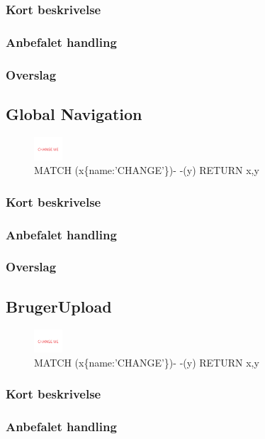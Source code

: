 \documentclass{article}
\begin{document}
\subsubsection{Kort beskrivelse}
\subsubsection{Anbefalet handling}
\subsubsection{Overslag}


\subsection{Global Navigation}
\begin{figure}[h]
\includegraphics[width=30pt]{CHANGE.PNG}
\caption{MATCH (x\{name:'CHANGE'\})- -(y) RETURN x,y}
\end{figure}
\subsubsection{Kort beskrivelse}
\subsubsection{Anbefalet handling}
\subsubsection{Overslag}


\subsection{BrugerUpload}
\begin{figure}[h]
\includegraphics[width=30pt]{CHANGE.PNG}
\caption{MATCH (x\{name:'CHANGE'\})- -(y) RETURN x,y}
\end{figure}
\subsubsection{Kort beskrivelse}
\subsubsection{Anbefalet handling}
\end{document}
